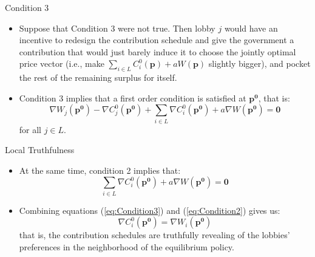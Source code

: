 \documentclass[aspectratio=169]{beamer}
\begin{document}

\begin{frame}{Condition 3}

\begin{itemize}
    \item<1-> Suppose that Condition 3 were not true.  Then lobby $ j $ would have an incentive to redesign the contribution schedule and give the government a contribution that would just barely induce it to choose the jointly optimal price vector (i.e., make $ \sum_{i \in L} C_{i}^{0}\left( \mathbf{p} \right) + a W\left( \mathbf{p} \right) $ slightly bigger), and pocket the rest of the remaining surplus for itself.
    \item<2-> Condition 3 implies that a first order condition is satisfied at $ \mathbf{p^{0}} $, that is:
    \begin{equation}
        \nabla W_{j}\left( \mathbf{p^{0}} \right) - \nabla C_{j}^{0}\left( \mathbf{p^{0}} \right) + \sum_{i \in L} \nabla C_{i}^{0}\left( \mathbf{p^{0}} \right) + a \nabla W\left( \mathbf{p^{0}} \right) = \mathbf{0}
        \label{eq:Condition3}
    \end{equation}
    for all $ j \in L $.
\end{itemize}
    
\end{frame}


\begin{frame}{Local Truthfulness}

\begin{itemize}
    \item<1-> At the same time, condition 2 implies that:
    \begin{equation}
        \sum_{i \in L} \nabla C_{i}^{0}\left( \mathbf{p^{0}} \right) + a \nabla W\left( \mathbf{p^{0}} \right) = \mathbf{0}
        \label{eq:Condition2}
    \end{equation}
    \item<2-> Combining equations (\ref{eq:Condition3}) and (\ref{eq:Condition2}) gives us:
    \begin{equation*}
        \nabla C_{i}^{0}\left( \mathbf{p^{0}} \right) = \nabla W_{i}\left( \mathbf{p^{0}} \right)
    \end{equation*}
    that is, the contribution schedules are truthfully revealing of the lobbies’ preferences in the neighborhood of the equilibrium policy.
\end{itemize}
    
\end{frame}
\end{document}
